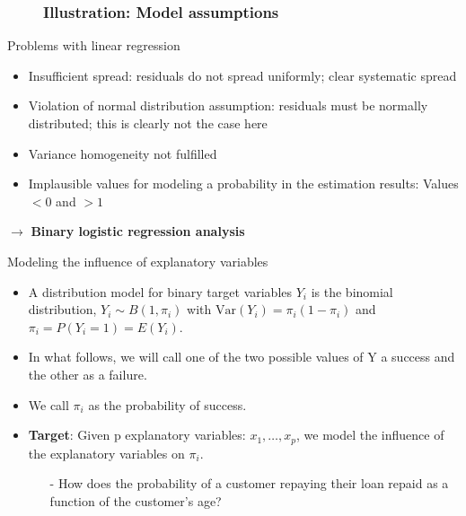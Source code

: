 \documentclass{beamer}
\begin{document}
\begin{frame}
	\begin{figure}	
		\frametitle{Illustration: Model assumptions}
		\centering
		\hspace*{-0.8cm}
	\end{figure}
\end{frame}

\begin{frame}{Problems with linear regression}
	\vspace{-9mm}
	\begin{itemize}
		\item Insufficient spread: residuals do not spread uniformly; clear systematic spread
		\vspace{3mm}
		\item Violation of normal distribution assumption: residuals must be normally distributed; this is clearly not the case here
		\vspace{3mm}
		\item Variance homogeneity not fulfilled
		\vspace{3mm}
		\item Implausible values for modeling a probability in the estimation results: Values $<0$ and $>1$
	\end{itemize}
	\vspace{3mm}
	$\rightarrow$ \textbf{Binary logistic regression analysis}
\end{frame}


\begin{frame}{Modeling the influence of explanatory variables}
	\vspace{-3mm}
	\begin{itemize}
		\item A distribution model for binary target variables $Y_i$ is the binomial distribution, $Y_i \sim B(1,\pi_i)$ with $\text{Var}(Y_i)=\pi_i(1-\pi_i) $ and $\pi_i=P(Y_i=1)=E(Y_i)$.
		\vspace{2mm}
		\item In what follows, we will call one of the two possible values of Y a
		success and the other as a failure.
		\vspace{2mm}
		\item We call $\pi_i$ as the probability of success.\
		\vspace{2mm}
		\item \textbf{Target}: Given p explanatory variables: $x_1,\ldots,x_p$, we model the influence of the explanatory variables on
		$\pi_i$.
		\begin{itemize}
			\vspace{2mm}
			\item[-] How does the probability of a customer repaying their
			loan repaid as a function of the customer's age?
		\end{itemize}
	\end{itemize}
	
\end{frame}
\end{document}
